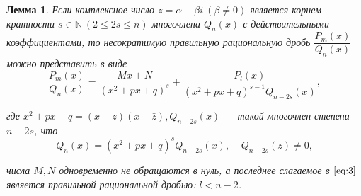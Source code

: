 \documentclass[12pt]{article}
\numberwithin{equation}{section}
\newtheorem{lemma}{Лемма}[section]
\begin{document}
\begin{lemma} \label{lemm:1:2}
Если комплексное число $z = \alpha + \beta i~(\beta \neq 0)$ является корнем кратности $s \in \mathbb{N}~(2 \leqslant 2s \leqslant n) $ многочлена $Q_n(x)$ с действительными коэффициентами, то несократимую правильную рациональную дробь $\dfrac{P_m(x)}{Q_n(x)}$ можно представить в виде
\begin{equation}
\frac{P_m(x)}{Q_n(x)} = \frac{Mx + N}{(x^2 + px + q)^s} + \frac{P_l(x)}{(x^2 + px + q)^{s-1} Q_{n-2s}(x)}, \label{eq:3}
\end{equation}

где $x^2 + px + q = (x-z)(x-\bar{z}), Q_{n-2s}(x)$ --- такой многочлен степени $n- 2s$, что
\[ Q_n(x) = (x^2 + px + q)^s Q_{n-2s}(x),~~~~~Q_{n-2s}(z) \neq 0, \]

числа $M, N$ одновременно не обращаются в нуль, а последнее слагаемое в $\eqref{eq:3}$ является правильной рациональной дробью: $l < n - 2$.
\end{lemma}
\end{document}
